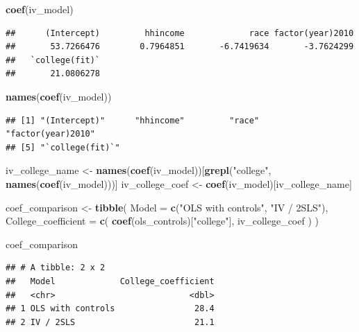 \documentclass[
]{article}
\newenvironment{Shaded}{\begin{snugshade}}{\end{snugshade}}
\newcommand{\AttributeTok}[1]{\textcolor[rgb]{0.13,0.29,0.53}{#1}}
\newcommand{\FunctionTok}[1]{\textcolor[rgb]{0.13,0.29,0.53}{\textbf{#1}}}
\newcommand{\NormalTok}[1]{#1}
\newcommand{\OtherTok}[1]{\textcolor[rgb]{0.56,0.35,0.01}{#1}}
\newcommand{\StringTok}[1]{\textcolor[rgb]{0.31,0.60,0.02}{#1}}
\begin{document}
\begin{Shaded}
\begin{Highlighting}[]
\FunctionTok{coef}\NormalTok{(iv\_model)}
\end{Highlighting}
\end{Shaded}

\begin{verbatim}
##      (Intercept)         hhincome             race factor(year)2010 
##       53.7266476        0.7964851       -6.7419634       -3.7624299 
##   `college(fit)` 
##       21.0806278
\end{verbatim}

\begin{Shaded}
\begin{Highlighting}[]
\FunctionTok{names}\NormalTok{(}\FunctionTok{coef}\NormalTok{(iv\_model))}
\end{Highlighting}
\end{Shaded}

\begin{verbatim}
## [1] "(Intercept)"      "hhincome"         "race"             "factor(year)2010"
## [5] "`college(fit)`"
\end{verbatim}

\begin{Shaded}
\begin{Highlighting}[]
\NormalTok{iv\_college\_name }\OtherTok{\textless{}{-}} \FunctionTok{names}\NormalTok{(}\FunctionTok{coef}\NormalTok{(iv\_model))[}\FunctionTok{grepl}\NormalTok{(}\StringTok{"college"}\NormalTok{, }\FunctionTok{names}\NormalTok{(}\FunctionTok{coef}\NormalTok{(iv\_model)))]}
\NormalTok{iv\_college\_coef }\OtherTok{\textless{}{-}} \FunctionTok{coef}\NormalTok{(iv\_model)[iv\_college\_name]}

\NormalTok{coef\_comparison }\OtherTok{\textless{}{-}} \FunctionTok{tibble}\NormalTok{(}
  \AttributeTok{Model =} \FunctionTok{c}\NormalTok{(}\StringTok{"OLS with controls"}\NormalTok{, }\StringTok{"IV / 2SLS"}\NormalTok{),}
  \AttributeTok{College\_coefficient =} \FunctionTok{c}\NormalTok{(}
    \FunctionTok{coef}\NormalTok{(ols\_controls)[}\StringTok{"college"}\NormalTok{],}
\NormalTok{    iv\_college\_coef}
\NormalTok{  )}
\NormalTok{)}

\NormalTok{coef\_comparison}
\end{Highlighting}
\end{Shaded}

\begin{verbatim}
## # A tibble: 2 x 2
##   Model             College_coefficient
##   <chr>                           <dbl>
## 1 OLS with controls                28.4
## 2 IV / 2SLS                        21.1
\end{verbatim}
\end{document}
